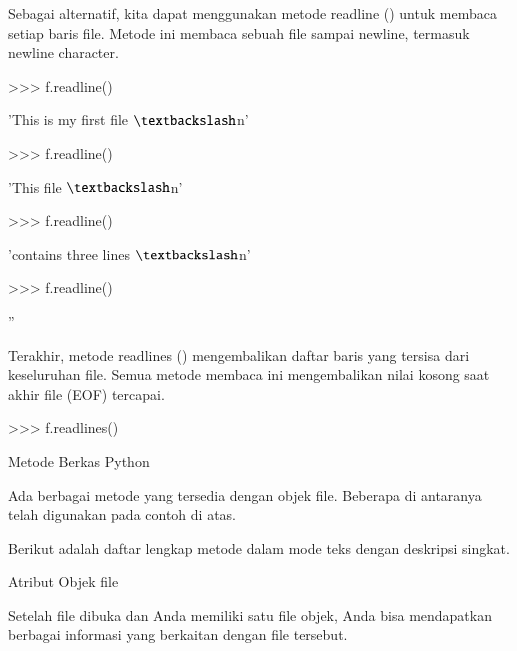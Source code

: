 \documentclass[a4paper,12pt]{report}
\begin{document}
\vspace{12pt}
\noindent 
Sebagai alternatif, kita dapat menggunakan metode readline () untuk membaca setiap baris file. Metode ini membaca sebuah file sampai newline, termasuk newline character. \par
\vspace{12pt}
\noindent 
>>> f.readline() \par
\noindent 
'This is my first file $  \textbackslash  $n' \par
\vspace{12pt}
\noindent 
>>> f.readline() \par
\noindent 
'This file $  \textbackslash  $n' \par
\vspace{12pt}
\noindent 
>>> f.readline() \par
\noindent 
'contains three lines $  \textbackslash  $n' \par
\vspace{12pt}
\noindent 
>>> f.readline() \par
\noindent 
'' \par
\vspace{16pt}
\noindent 
Terakhir, metode readlines () mengembalikan daftar baris yang tersisa dari keseluruhan file. Semua metode membaca ini mengembalikan nilai kosong saat akhir file (EOF) tercapai. \par
\vspace{12pt}
\noindent 
>>> f.readlines() \par
{} \par
\vspace{12pt}
\vspace{12pt}
\noindent 
Metode Berkas Python \par
\vspace{12pt}
\noindent 
Ada berbagai metode yang tersedia dengan objek file. Beberapa di antaranya telah digunakan pada contoh di atas. \par
\vspace{12pt}
\noindent 
Berikut adalah daftar lengkap metode dalam mode teks dengan deskripsi singkat. \par
\vspace{12pt}
\noindent 
Atribut Objek file \par
\vspace{12pt}
\noindent 
Setelah file dibuka dan Anda memiliki satu file objek, Anda bisa mendapatkan berbagai informasi yang berkaitan dengan file tersebut. \par
\end{document}
